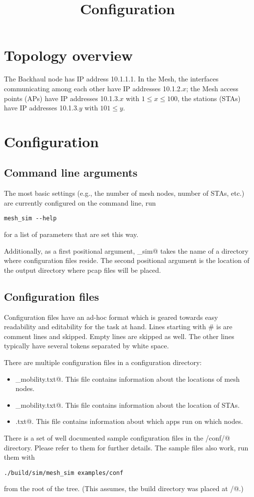 \documentclass{article}
\title{Configuration}
\begin{document}
\section{Topology overview}

The Backhaul node has IP address 10.1.1.1.  In the Mesh, the interfaces
communicating among each other have IP addresses 10.1.2.$x$; the Mesh
access points (APs) have IP addresses 10.1.3.$x$ with $1 \leq x \leq
100$, the stations (STAs) have IP addresses 10.1.3.$y$ with $101 \leq
y$.

\section{Configuration}

\subsection{Command line arguments}

The most basic settings (e.g., the number of mesh nodes, number of STAs,
etc.) are currently configured on the command line, run
\begin{verbatim}
mesh_sim --help
\end{verbatim}
for a list of parameters that are set this way.

Additionally, as a first positional argument, \verb@mesh_sim@ takes the
name of a directory where configuration files reside.  The second
positional argument is the location of the output directory where pcap
files will be placed.

\subsection{Configuration files}

Configuration files have an ad-hoc format which is geared towards easy
readability and editability for the task at hand.  Lines starting with \#
is are comment lines and skipped.  Empty lines are skipped as well.
The other lines typically have several tokens separated by white space.

There are multiple configuration files in a configuration directory:
\begin{itemize}

\item \verb@mesh_mobility.txt@.  This file contains information about
the locations of mesh nodes.

\item \verb@sta_mobility.txt@.  This file contains information about the
location of STAs.

\item \verb@apps.txt@.  This file contains information about which apps
run on which nodes.

\end{itemize}
There is a set of well documented sample configuration files in the
\verb@examples/conf/@ directory.  Please refer to them for further
details.  The sample files also work, run them with
\begin{verbatim}
./build/sim/mesh_sim examples/conf
\end{verbatim}
from the root of the tree.  (This assumes, the build directory was
placed at \verb@build/@.)
\end{document}

